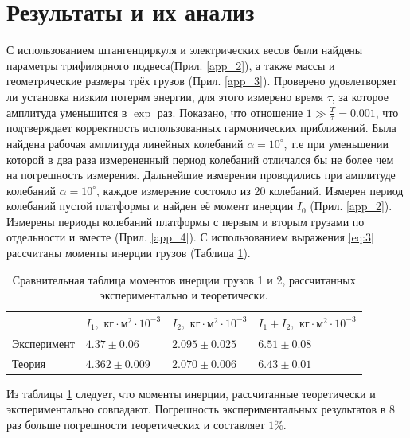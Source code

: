 \documentclass[12pt]{article}
\begin{document}
\section{Результаты и их анализ}
С использованием штангенциркуля и электрических весов были найдены параметры трифилярного подвеса(Прил. \ref{app_2}), а также массы и геометрические
размеры трёх грузов (Прил. \ref{app_3}).
Проверено удовлетворяет ли установка низким потерям энергии, для этого измерено время $\tau$, за которое амплитуда уменьшится в $\exp$ раз. Показано,
что отношение $1 \gg \frac{T}{\tau} = 0.001$, что подтверждает корректность использованных гармонических приближений.
Была найдена рабочая амплитуда линейных колебаний $\alpha = 10^\circ$, т.е при уменьшении которой в два раза измерененный период колебаний отличался бы не более чем на погрешность
измерения. Дальнейшие измерения проводились при амплитуде колебаний $\alpha = 10^\circ$, каждое измерение состояло из 20 колебаний.
Измерен период колебаний пустой платформы и найден её момент инерции $I_0$ (Прил. \ref{app_2}). Измерены периоды колебаний платформы с первым и вторым
грузами по отдельности и вместе (Прил. \ref{app_4}). С использованием выражения \ref{eq:3} рассчитаны моменты инерции грузов (Таблица \ref{tab:3}).
\begin{table}[H]
    \centering
    \begin{tabular}{|l|l|l|l|}
        \hline
                    & $I_1, \textrm{ кг}\cdot\textrm{м}^2\cdot 10^{-3}$ & $I_2, \textrm{ кг}\cdot\textrm{м}^2\cdot 10^{-3}$ & $I_1 + I_2, \textrm{ кг}\cdot\textrm{м}^2\cdot 10^{-3}$ \\ 
        \hline
        Эксперимент & $4.37 \pm 0.06$                                   & $2.095 \pm 0.025$                                 & $6.51 \pm 0.08$                                         \\
        \hline
        Теория      & $4.362 \pm 0.009$                                 & $2.070 \pm 0.006$                                 & $6.43 \pm 0.01$                                         \\
        \hline
    \end{tabular}
    
    \caption{Сравнительная таблица моментов инерции грузов 1 и 2, рассчитанных экспериментально и теоретически.}
    \label{tab:3}
\end{table}

Из таблицы \ref{tab:3} следует, что моменты инерции, рассчитанные теоретически и экспериментально совпадают. Погрешность экспериментальных 
результатов в $8$ раз больше погрешности теоретических и составляет $1\%$.
\end{document}

